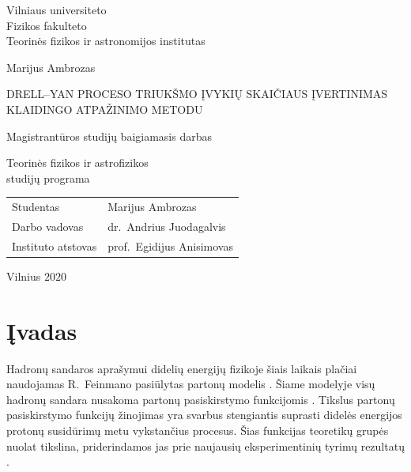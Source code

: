 \documentclass[a4paper, 12pt, oneside]{article}
\begin{document}

\begin{titlepage}
\centering
{\large Vilniaus universiteto \\ Fizikos fakulteto \\ Teorinės fizikos ir astronomijos institutas \par}
\vspace{3.5cm}
{\large Marijus Ambrozas \par}
\vspace{0.3cm}
{\large DRELL--YAN PROCESO TRIUKŠMO ĮVYKIŲ SKAIČIAUS ĮVERTINIMAS KLAIDINGO ATPAŽINIMO METODU\par}
\vspace{0.8cm}
{\large Magistrantūros studijų baigiamasis darbas \par}
\vspace{0.8cm}
{\large Teorinės fizikos ir astrofizikos \\ studijų programa \par}
\vspace{3.5cm}
{\large \begin{tabular*}{0.9\textwidth}{@{\extracolsep{\fill}}ll}
Studentas & Marijus Ambrozas\tabularnewline[0.5cm]
Darbo vadovas & dr.\ Andrius Juodagalvis\tabularnewline[0.5cm]
Instituto atstovas & prof.\ Egidijus Anisimovas\tabularnewline[0.5cm]
\end{tabular*} \par}
\vspace{4cm}
{\large Vilnius $2020$\par}
\end{titlepage}


\clearpage
\addtocounter{page}{1}
\tableofcontents
\clearpage

\section*{Įvadas} 
Hadronų sandaros aprašymui didelių energijų fizikoje šiais laikais plačiai naudojamas R.\ Feinmano pasiūlytas
partonų modelis \cite{FeynPartons}.
Šiame modelyje visų hadronų sandara nusakoma partonų pasiskirstymo funkcijomis \cite{BjorkPartons}.
Tikslus partonų pasiskirstymo funkcijų žinojimas yra svarbus stengiantis suprasti didelės energijos protonų susidūrimų
metu vykstančius procesus.
Šias funkcijas teoretikų grupės nuolat tikslina, priderindamos jas prie naujausių eksperimentinių tyrimų rezultatų
\cite{PDF_MMHT2015, PDF_CJ15, NNPDF, PDF_ABMP16, PDF_MMHT2019, CTEQ2019}.
\end{document}
